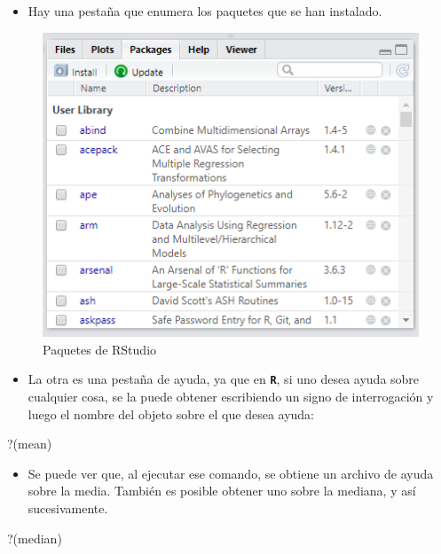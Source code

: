 \documentclass[
]{article}
\newenvironment{Shaded}{\begin{snugshade}}{\end{snugshade}}
\newcommand{\AttributeTok}[1]{\textcolor[rgb]{0.13,0.29,0.53}{#1}}
\newcommand{\NormalTok}[1]{#1}
\newcommand{\StringTok}[1]{\textcolor[rgb]{0.31,0.60,0.02}{#1}}
\providecommand{\tightlist}{%
  \setlength{\itemsep}{0pt}\setlength{\parskip}{0pt}}
\begin{document}
\begin{itemize}
\tightlist
\item
  Hay una pestaña que enumera los paquetes que se han instalado.
\end{itemize}

\begin{figure}

{\centering \includegraphics[width=0.6\linewidth]{imagenes/paquetes} 

}

\caption{Paquetes de RStudio}\label{fig:unnamed-chunk-141}
\end{figure}

\begin{itemize}
\tightlist
\item
  La otra es una pestaña de ayuda, ya que en \textbf{\texttt{R}}, si uno desea ayuda sobre cualquier cosa, se la puede obtener escribiendo un signo de interrogación y luego el nombre del objeto sobre el que desea ayuda:
\end{itemize}

\begin{Shaded}
\begin{Highlighting}[]
\StringTok{\textasciigrave{}}\AttributeTok{?}\StringTok{\textasciigrave{}}\NormalTok{(mean)}
\end{Highlighting}
\end{Shaded}

\begin{itemize}
\tightlist
\item
  Se puede ver que, al ejecutar ese comando, se obtiene un archivo de ayuda sobre la media. También es posible obtener uno sobre la mediana, y así sucesivamente.
\end{itemize}

\begin{Shaded}
\begin{Highlighting}[]
\StringTok{\textasciigrave{}}\AttributeTok{?}\StringTok{\textasciigrave{}}\NormalTok{(median)}
\end{Highlighting}
\end{Shaded}
\end{document}

